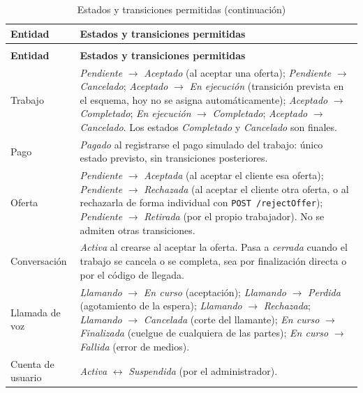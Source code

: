 \documentclass[doc,12pt,a4paper]{apa7}
\begin{document}
\begin{longtable}{|P{3.4cm}|L{10.6cm}|}
\caption{Estados y transiciones permitidas}\\
\hline
\textbf{Entidad} & \textbf{Estados y transiciones permitidas} \\ \hline
\endfirsthead
\caption[]{Estados y transiciones permitidas (continuación)}\\
\hline
\textbf{Entidad} & \textbf{Estados y transiciones permitidas} \\ \hline
\endhead
\hline
\endfoot

Trabajo & \textit{Pendiente} $\rightarrow$ \textit{Aceptado} (al aceptar una oferta);
\textit{Pendiente} $\rightarrow$ \textit{Cancelado}; \textit{Aceptado} $\rightarrow$ \textit{En ejecución} (transición prevista en el esquema, hoy no se asigna automáticamente);
\textit{Aceptado} $\rightarrow$ \textit{Completado}; \textit{En ejecución} $\rightarrow$ \textit{Completado};
\textit{Aceptado} $\rightarrow$ \textit{Cancelado}. Los estados \textit{Completado} y \textit{Cancelado} son finales. \\ \hline

Pago & \textit{Pagado} al registrarse el pago simulado del trabajo: único estado previsto, sin transiciones posteriores. \\ \hline

Oferta & \textit{Pendiente} $\rightarrow$ \textit{Aceptada} (al aceptar el cliente esa oferta);
\textit{Pendiente} $\rightarrow$ \textit{Rechazada} (al aceptar el cliente otra oferta, o al rechazarla de forma individual con \texttt{POST /rejectOffer});
\textit{Pendiente} $\rightarrow$ \textit{Retirada} (por el propio trabajador). No se admiten otras transiciones. \\ \hline

Conversación & \textit{Activa} al crearse al aceptar la oferta. Pasa a \textit{cerrada} cuando el trabajo se cancela o se completa, sea por finalización directa o por el código de llegada. \\ \hline

Llamada de voz & \textit{Llamando} $\rightarrow$ \textit{En curso} (aceptación);
\textit{Llamando} $\rightarrow$ \textit{Perdida} (agotamiento de la espera);
\textit{Llamando} $\rightarrow$ \textit{Rechazada}; \textit{Llamando} $\rightarrow$ \textit{Cancelada} (corte del llamante);
\textit{En curso} $\rightarrow$ \textit{Finalizada} (cuelgue de cualquiera de las partes);
\textit{En curso} $\rightarrow$ \textit{Fallida} (error de medios). \\ \hline

Cuenta de usuario & \textit{Activa} $\leftrightarrow$ \textit{Suspendida} (por el administrador). \\ \hline
\end{longtable}
\end{document}

